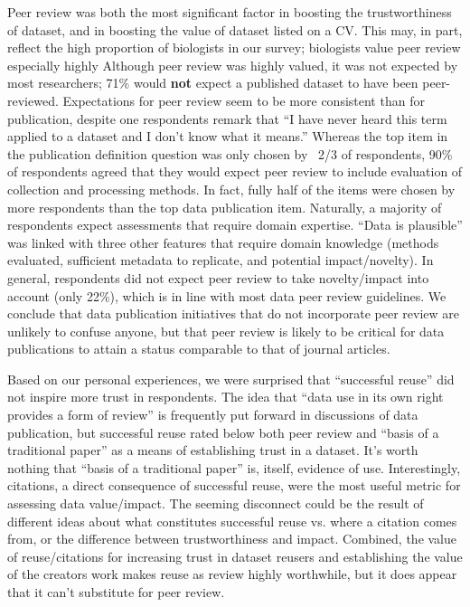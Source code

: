 \documentclass[10pt]{article}
\begin{document}
Peer review was both the most significant factor in boosting the trustworthiness of dataset, and in boosting the value of dataset listed on a CV.
This may, in part, reflect the high proportion of biologists in our survey; biologists value peer review especially highly\cite{harley_assessing_2010}
Although peer review was highly valued, it was not expected by most researchers; 71\% would \textbf{not} expect a published dataset to have been peer-reviewed.
Expectations for peer review seem to be more consistent than for publication, despite one respondents remark that ``I have never heard this term applied to a dataset and I don't know what it means.''
Whereas the top item in the publication definition question was only chosen by ~2/3 of respondents, 90\% of respondents agreed that they would expect peer review to include evaluation of collection and processing methods.
In fact, fully half of the items were chosen by more respondents than the top data publication item.
Naturally, a majority of respondents expect assessments that require domain expertise.
``Data is plausible'' was linked with three other features that require domain knowledge (methods evaluated, sufficient metadata to replicate, and potential impact/novelty).
In general, respondents did not expect peer review to take novelty/impact into account (only 22\%), which is in line with most data peer review guidelines.
We conclude that data publication initiatives that do not incorporate peer review are unlikely to confuse anyone, but that peer review is likely to be critical for data publications to attain a status comparable to that of journal articles.


Based on our personal experiences, we were surprised that ``successful reuse'' did not inspire more trust in respondents.
The idea that ``data use in its own right provides a form of review''\cite{parsons_data_2010} is frequently put forward in discussions of data publication, but successful reuse rated below both peer review and ``basis of a traditional paper'' as a means of establishing trust in a dataset.
It's worth nothing that ``basis of a traditional paper'' is, itself, evidence of use.
Interestingly, citations, a direct consequence of successful reuse, were the most useful metric for assessing data value/impact.
The seeming disconnect could be the result of different ideas about what constitutes successful reuse vs. where a citation comes from, or the difference between trustworthiness and impact.
Combined, the value of reuse/citations for increasing trust in dataset reusers and establishing the value of the creators work makes reuse as review highly worthwhile, but it does appear that it can't substitute for peer review.
\end{document}
